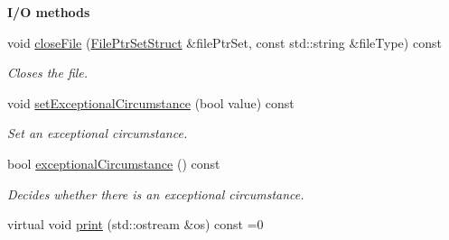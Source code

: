 \begin{Indent}{\bf I/\-O methods}
\begin{DoxyCompactItemize}
void \hyperlink{class_q_u_e_s_o_1_1_base_environment_ab712bff194ddd91459d4ea8715c77e8b}{close\-File} (\hyperlink{struct_q_u_e_s_o_1_1_file_ptr_set_struct}{File\-Ptr\-Set\-Struct} \&file\-Ptr\-Set, const std\-::string \&file\-Type) const 
\begin{DoxyCompactList}\small\item\em Closes the file. \end{DoxyCompactList}\item 
void \hyperlink{class_q_u_e_s_o_1_1_base_environment_abb2a6a8de19058957f856341fce2440e}{set\-Exceptional\-Circumstance} (bool value) const 
\begin{DoxyCompactList}\small\item\em Set an exceptional circumstance. \end{DoxyCompactList}\item 
bool \hyperlink{class_q_u_e_s_o_1_1_base_environment_af0bc451b18302cfd5ee747c321e1c6e5}{exceptional\-Circumstance} () const 
\begin{DoxyCompactList}\small\item\em Decides whether there is an exceptional circumstance. \end{DoxyCompactList}\item 
virtual void \hyperlink{class_q_u_e_s_o_1_1_base_environment_adba5fa84e671bb56eb001ec596729a4e}{print} (std\-::ostream \&os) const =0
\end{DoxyCompactItemize}
\end{Indent}

